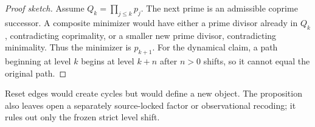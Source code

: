 \begin{proof}[Proof sketch]
Assume \(Q_k=\prod_{j\le k}p_j\).  The next prime is an admissible coprime
successor.  A composite minimizer would have either a prime divisor already in
\(Q_k\), contradicting coprimality, or a smaller new prime divisor,
contradicting minimality.  Thus the minimizer is \(p_{k+1}\).  For the
dynamical claim, a path beginning at level \(k\) begins at level \(k+n\) after
\(n>0\) shifts, so it cannot equal the original path.
\end{proof}

Reset edges would create cycles but would define a new object.  The proposition
also leaves open a separately source-locked factor or observational recoding;
it rules out only the frozen strict level shift.
